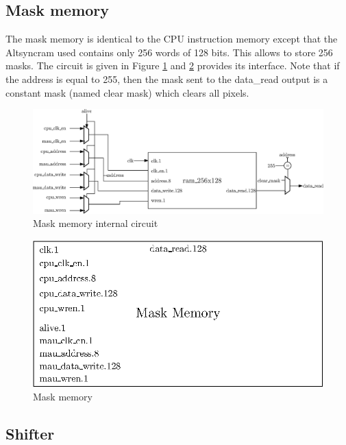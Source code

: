 \subsection{Mask memory}

The mask memory is identical to the CPU instruction memory except that the Altsyncram used contains 
only 256 words of 128 bits. This allows to store 256 masks. The circuit is given in Figure
\ref{fig:gpu/mask_memory_in} and \ref{fig:gpu/mask_memory} provides its interface. Note that if the 
address is equal to 255, then the mask sent to the data\_read output is a constant mask 
(named clear mask) which clears all pixels.

\begin{figure}[H]
    \centering
    \includegraphics[width=\linewidth]{Chapter4-GPU_CLKU/res/mask_memory_in}
    \caption{Mask memory internal circuit}
    \label{fig:gpu/mask_memory_in}
\end{figure}

\begin{figure}[H]
    \centering
    \includegraphics[scale=0.8]{Chapter4-GPU_CLKU/res/mask_memory}
    \caption{Mask memory}
    \label{fig:gpu/mask_memory}
\end{figure}

\subsection{Shifter}

